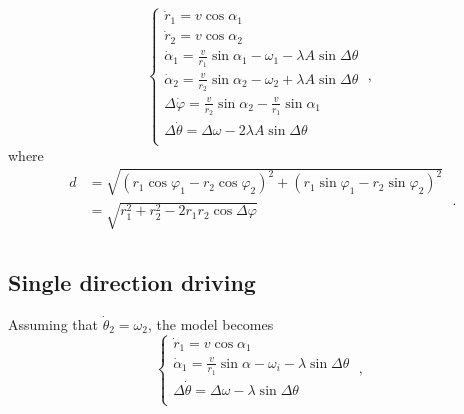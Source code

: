 \documentclass{article}
\begin{document}
\begin{equation}\label{eq:l1.2}
    \begin{cases}
        \dot{r}_1=v\cos \alpha _1\\
        \dot{r}_2=v\cos \alpha _2\\
        \dot{\alpha}_1=\frac{v}{r_1}\sin \alpha _1-\omega _1-\lambda A\sin \Delta \theta\\
        \dot{\alpha}_2=\frac{v}{r_2}\sin \alpha _2-\omega _2+\lambda A\sin \Delta \theta\\
        \Delta \dot{\varphi}=\frac{v}{r_2}\sin \alpha _2-\frac{v}{r_1}\sin \alpha _1\\
        \Delta \dot{\theta}=\Delta \omega -2\lambda A \sin \Delta \theta\\
    \end{cases}\;,
\end{equation}
where
$$
\begin{aligned}
	d&=\sqrt{\left( r_1\cos \varphi _1-r_2\cos \varphi _2 \right) ^2+\left( r_1\sin \varphi _1-r_2\sin \varphi _2 \right) ^2}\\
	&=\sqrt{r_{1}^{2}+r_{2}^{2}-2r_1r_2\cos \Delta \varphi}\\
\end{aligned}\;.
$$

\subsection{Single direction driving}

Assuming that $\dot{\theta}_2=\omega _2$, the model becomes
$$
\begin{cases}
	\dot{r}_1=v\cos \alpha _1\\
	\dot{\alpha}_1=\frac{v}{r_1}\sin \alpha -\omega _i-\lambda \sin \Delta \theta\\
	\Delta \dot{\theta}=\Delta \omega -\lambda \sin \Delta \theta\\
\end{cases}\;,
$$
\end{document}
